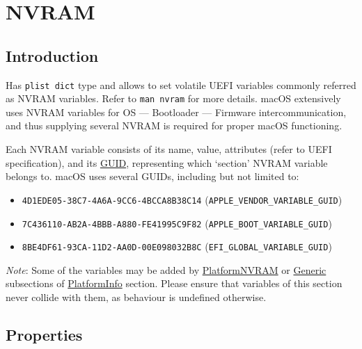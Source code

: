 \documentclass[]{article}
\providecommand{\tightlist}{%
  \setlength{\itemsep}{0pt}\setlength{\parskip}{0pt}}
\begin{document}
\section{NVRAM}\label{nvram}

\subsection{Introduction}\label{nvramintro}

Has \texttt{plist\ dict} type and allows to set volatile UEFI variables
commonly referred as NVRAM variables. Refer to \texttt{man\ nvram} for
more details. macOS extensively uses NVRAM variables for OS --- Bootloader
--- Firmware intercommunication, and thus supplying several NVRAM is
required for proper macOS functioning.

Each NVRAM variable consists of its name, value, attributes (refer to
UEFI specification), and its
\href{https://en.wikipedia.org/wiki/Universally_unique_identifier}{GUID},
representing which `section' NVRAM variable belongs to. macOS uses
several GUIDs, including but not limited to:

\begin{itemize}
\tightlist
\item
  \texttt{4D1EDE05-38C7-4A6A-9CC6-4BCCA8B38C14}
  (\texttt{APPLE\_VENDOR\_VARIABLE\_GUID})
\item
  \texttt{7C436110-AB2A-4BBB-A880-FE41995C9F82}
  (\texttt{APPLE\_BOOT\_VARIABLE\_GUID})
\item
  \texttt{8BE4DF61-93CA-11D2-AA0D-00E098032B8C}
  (\texttt{EFI\_GLOBAL\_VARIABLE\_GUID})
\end{itemize}

\emph{Note}: Some of the variables may be added by
\hyperref[platforminfonvram]{PlatformNVRAM} or
\hyperref[platforminfogeneric]{Generic} subsections of
\hyperref[platforminfo]{PlatformInfo} section.
Please ensure that variables of this section never collide with them,
as behaviour is undefined otherwise.

\subsection{Properties}\label{nvramprops}
\end{document}
